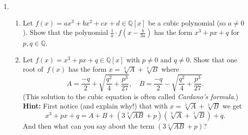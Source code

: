 \documentclass[11pt]{article}
\begin{document}
\begin{enumerate}
\item \begin{enumerate}
\item Let $f(x) = ax^3+bx^2+cx+d \in \mathbb{Q}[x]$ be a cubic polynomial (so $a \neq 0$). Show that the polynomial $\frac{1}{a} \cdot f(x-\frac{b}{3a})$ has the form $x^3+px+q$ for $p,q\in \mathbb{Q}$.
\item Let $f(x) = x^3+px+q\in \mathbb{Q}[x]$ with $p\neq 0$ and $q\neq 0$. Show that one root of~$f(x)$ has the form $x=\sqrt[3]{A}+\sqrt[3]{B}$ where 
\[ A = \frac{-q}{2} + \sqrt{\frac{q^2}{4}+\frac{p^3}{27}}, \quad B = \frac{-q}{2} - \sqrt{\frac{q^2}{4}+\frac{p^3}{27}}.\]
(This solution to the cubic equation is often called \emph{Cardano's formula}.) \\
{\bf Hint:} First notice (and explain why!) that with $x=\sqrt[3]{A}+\sqrt[3]{B}$ we get 
\[ x^3+px+q = A+B+(3\sqrt[3]{AB}+p)(\sqrt[3]{A}+\sqrt[3]{B})+q.\]
And then what can you say about the term $(3\sqrt[3]{AB}+p)$?
\end{enumerate}

\end{enumerate}
\end{document}
